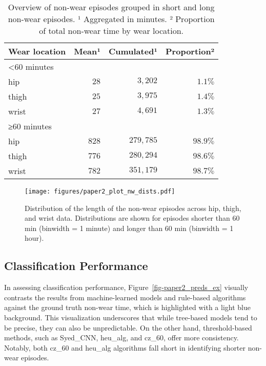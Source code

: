 \documentclass[
  10pt,
]{scrbook}
\begin{document}
\hypertarget{tbl-9}{}
\begin{longtable}{lrrr}
\caption{\label{tbl-9}Overview of non-wear episodes grouped in short and long non-wear
episodes. ¹ Aggregated in minutes. ² Proportion of total non-wear time
by wear location. }\tabularnewline

\toprule
Wear location & Mean¹ & Cumulated¹ & Proportion² \\ 
\midrule
\multicolumn{4}{l}{<60 minutes} \\ 
\midrule
hip & $28$ & $3,202$ & $1.1\%$ \\ 
thigh & $25$ & $3,975$ & $1.4\%$ \\ 
wrist & $27$ & $4,691$ & $1.3\%$ \\ 
\midrule
\multicolumn{4}{l}{≥60 minutes} \\ 
\midrule
hip & $828$ & $279,785$ & $98.9\%$ \\ 
thigh & $776$ & $280,294$ & $98.6\%$ \\ 
wrist & $782$ & $351,179$ & $98.7\%$ \\ 
\bottomrule
\end{longtable}

\endgroup

\begin{figure}

{\centering \texttt{[image: figures/paper2\_plot\_nw\_dists.pdf]}

}

\caption{\label{fig-paper2_nw_dists}Distribution of the length of the
non-wear episodes across hip, thigh, and wrist data. Distributions are
shown for episodes shorter than 60 min (binwidth = 1 minute) and longer
than 60 min (binwidth = 1 hour).}

\end{figure}

\hypertarget{classification-performance}{%
\subsection{Classification
Performance}\label{classification-performance}}

In assessing classification performance,
Figure~\ref{fig-paper2_preds_ex} visually contrasts the results from
machine-learned models and rule-based algorithms against the ground
truth non-wear time, which is highlighted with a light blue background.
This visualization underscores that while tree-based models tend to be
precise, they can also be unpredictable. On the other hand,
threshold-based methods, such as Syed\_CNN, heu\_alg, and cz\_60, offer
more consistency. Notably, both cz\_60 and heu\_alg algorithms fall
short in identifying shorter non-wear episodes.
\end{document}
